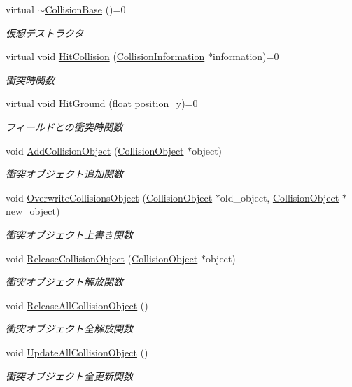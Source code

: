 \begin{DoxyCompactItemize}
virtual \mbox{\hyperlink{class_collision_base_a5ccb28bbf909f23f2df2fd6807b171f5}{$\sim$\+Collision\+Base}} ()=0
\begin{DoxyCompactList}\small\item\em 仮想デストラクタ \end{DoxyCompactList}\item 
virtual void \mbox{\hyperlink{class_collision_base_a610bcd9fec0c561949cd58fd01cd9a77}{Hit\+Collision}} (\mbox{\hyperlink{class_collision_information}{Collision\+Information}} $\ast$information)=0
\begin{DoxyCompactList}\small\item\em 衝突時関数 \end{DoxyCompactList}\item 
virtual void \mbox{\hyperlink{class_collision_base_a48c9d1d9e4286cde5054d4d2aa70bdd8}{Hit\+Ground}} (float position\+\_\+y)=0
\begin{DoxyCompactList}\small\item\em フィールドとの衝突時関数 \end{DoxyCompactList}\item 
void \mbox{\hyperlink{class_collision_base_a058c13832483ec037896b11d4f2cc563}{Add\+Collision\+Object}} (\mbox{\hyperlink{class_collision_object}{Collision\+Object}} $\ast$object)
\begin{DoxyCompactList}\small\item\em 衝突オブジェクト追加関数 \end{DoxyCompactList}\item 
void \mbox{\hyperlink{class_collision_base_a5d59d851904725f6301bebd2b952c49c}{Overwrite\+Collisions\+Object}} (\mbox{\hyperlink{class_collision_object}{Collision\+Object}} $\ast$old\+\_\+object, \mbox{\hyperlink{class_collision_object}{Collision\+Object}} $\ast$new\+\_\+object)
\begin{DoxyCompactList}\small\item\em 衝突オブジェクト上書き関数 \end{DoxyCompactList}\item 
void \mbox{\hyperlink{class_collision_base_ac962f33dd57509f41f750b5c7cb11d3b}{Release\+Collision\+Object}} (\mbox{\hyperlink{class_collision_object}{Collision\+Object}} $\ast$object)
\begin{DoxyCompactList}\small\item\em 衝突オブジェクト解放関数 \end{DoxyCompactList}\item 
void \mbox{\hyperlink{class_collision_base_a0e7e2c7f76b517da9defb18f4046d9a9}{Release\+All\+Collision\+Object}} ()
\begin{DoxyCompactList}\small\item\em 衝突オブジェクト全解放関数 \end{DoxyCompactList}\item 
void \mbox{\hyperlink{class_collision_base_af3e5d72e65eec844ca7e93ca01549c16}{Update\+All\+Collision\+Object}} ()
\begin{DoxyCompactList}\small\item\em 衝突オブジェクト全更新関数 \end{DoxyCompactList}\end{DoxyCompactItemize}
